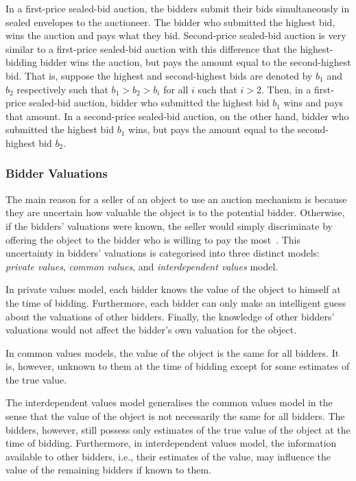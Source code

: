 In a first-price sealed-bid auction, the bidders submit their bids simultaneously in sealed envelopes to the auctioneer. The bidder who submitted the highest bid, wins the auction and pays what they bid. Second-price sealed-bid auction is very similar to a first-price sealed-bid auction with this difference that the highest-bidding bidder wins the auction, but pays the amount equal to the second-highest bid. That is, suppose the highest and second-highest bids are denoted by $b_1$ and $b_2$ respectively such that $b_1 > b_2 > b_i$ for all $i$ such that $i > 2$. Then, in a first-price sealed-bid auction, bidder who submitted the highest bid $b_1$ wins and pays that amount. In a second-price sealed-bid auction, on the other hand, bidder who submitted the highest bid $b_1$ wins, but pays the amount equal to the second-highest bid $b_2$.

\subsubsection{Bidder Valuations} %
\label{ssub:bidder_valuations_dmp}
The main reason for a seller of an object to use an auction mechanism is because they are uncertain how valuable the object is to the potential bidder. Otherwise, if the bidders' valuations were known, the seller would simply discriminate by offering the object to the bidder who is willing to pay the most~\cite{Krishna10}. This uncertainty in bidders' valuations is categorised into three distinct models: \emph{private values}, \emph{common values}, and \emph{interdependent values} model.

In private values model, each bidder knows the value of the object to himself at the time of bidding. Furthermore, each bidder can only make an intelligent guess about the valuations of other bidders. Finally, the knowledge of other bidders' valuations would not affect the bidder's own valuation for the object.

In common values models, the value of the object is the same for all bidders. It is, however, unknown to them at the time of bidding except for some estimates of the true value.

The interdependent values model generalises the common values model in the sense that the value of the object is not necessarily the same for all bidders. The bidders, however, still possess only estimates of the true value of the object at the time of bidding. Furthermore, in interdependent values model, the information available to other bidders, i.e., their estimates of the value, may influence the value of the remaining bidders if known to them.

